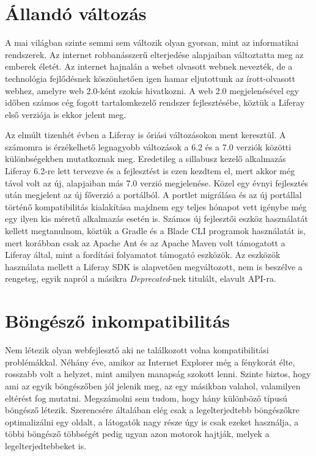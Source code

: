\documentclass[hidelinks, 12pt, a4paper]{report}
\begin{document}
\section{Állandó változás}

A mai világban szinte semmi sem változik olyan gyorsan, mint az informatikai rendszerek. Az internet robbanásszerű elterjedése alapjaiban változtatta meg az emberek életét. Az internet hajnalán a webet olvasott webnek nevezték, de a technológia fejlődésnek köszönhetően igen hamar eljutottunk az írott-olvasott webhez, amelyre web 2.0-ként szokás hivatkozni. A web 2.0 megjelenésével egy időben számos cég fogott tartalomkezelő rendszer fejlesztésébe, köztük a Liferay első verziója is ekkor jelent meg.

Az elmúlt tizenhét évben a Liferay is óriási változásokon ment keresztül. A számomra is érzékelhető legnagyobb változások a 6.2 és a 7.0 verziók közötti különbségekben mutatkoznak meg. Eredetileg a sillabusz kezelő alkalmazás Liferay 6.2-re lett tervezve és a fejlesztést is ezen kezdtem el, mert akkor még távol volt az új, alapjaiban más 7.0 verzió megjelenése. Közel egy évnyi fejlesztés után megjelent az új főverzió a portálból. A portlet migrálása és az új portállal történő kompatibilitás kialakítása majdnem egy teljes hónapot vett igénybe még egy ilyen kis méretű alkalmazás esetén is. Számos új fejlesztői eszköz használatát kellett megtanulnom, köztük a Gradle \cite{gradle} és a Blade CLI \cite{blade-cli} programok használatát is, mert korábban csak az Apache Ant \cite{apache-ant} és az Apache Maven \cite{apache-maven} volt támogatott a Liferay által, mint a fordítási folyamatot támogató eszközök. Az eszközök használata mellett a Liferay SDK is alapvetően megváltozott, nem is beszélve a rengeteg, egyik napról a másikra \emph{Deprecated}-nek titulált, elavult API-ra.


\section{Böngésző inkompatibilitás}

Nem létezik olyan webfejlesztő aki ne találkozott volna kompatibilitási problémákkal. Néhány éve, amikor az Internet Explorer még a fénykorát élte, rosszabb volt a helyzet, mint amilyen manapság szokott lenni. Szinte biztos, hogy ami az egyik böngészőben jól jelenik meg, az egy másikban valahol, valamilyen eltérést fog mutatni. Megszámolni sem tudom, hogy hány különböző típusú böngésző létezik. Szerencsére általában elég csak a legelterjedtebb böngészőkre optimalizálni egy oldalt, a látogatók nagy része úgy is csak ezeket használja, a többi böngésző többségét pedig ugyan azon motorok hajtják, melyek a legelterjedtebbeket is.
\end{document}
